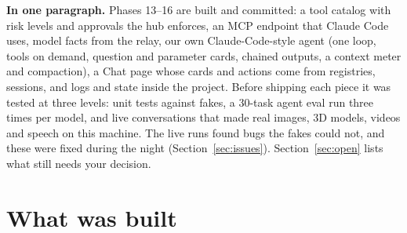 \documentclass[10.5pt,a4paper]{article}
\begin{document}
\vspace*{4.4cm}



\begin{note}
\textbf{In one paragraph.} Phases 13–16 are built and committed: a tool catalog with risk levels and approvals the hub enforces, an MCP endpoint that Claude Code uses, model facts from the relay, our own Claude-Code-style agent (one loop, tools on demand, question and parameter cards, chained outputs, a context meter and compaction), a Chat page whose cards and actions come from registries, sessions, and logs and state inside the project. Before shipping each piece it was tested at three levels: unit tests against fakes, a 30-task agent eval run three times per model, and live conversations that made real images, 3D models, videos and speech on this machine. The live runs found bugs the fakes could not, and these were fixed during the night (Section~\ref{sec:issues}). Section~\ref{sec:open} lists what still needs your decision.
\end{note}

\tableofcontents
\newpage

\section{What was built}

\end{document}
